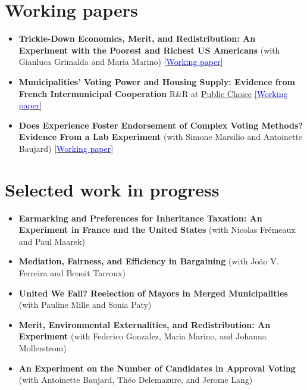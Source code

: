 \documentclass[11pt,a4paper,sans,unicode]{moderncv} %
\begin{document}
\section{Working papers}

\begin{itemize}

    \item \textbf{Trickle-Down Economics, Merit, and Redistribution: An Experiment with the Poorest and Richest US Americans} (with Gianluca Grimalda and Maria Marino) \href{https://hal.science/hal-05112815}{[\textcolor{blue}{Working paper}]} 
    \item \textbf{Municipalities' Voting Power and Housing Supply: Evidence from French Intermunicipal Cooperation} R\&R at \underline{Public Choice} \href{https://hal.science/hal-05642466}{[\textcolor{blue}{Working paper}]}
    \item \textbf{Does Experience Foster Endorsement of Complex Voting Methods? Evidence From a Lab Experiment} (with Simone Marsilio and Antoinette Baujard) \href{https://papers.ssrn.com/sol3/papers.cfm?abstract_id=7101008}{[\textcolor{blue}{Working paper}]}
\end{itemize}

\section{Selected work in progress}

\begin{itemize}

    \item \textbf{Earmarking and Preferences for Inheritance Taxation: An Experiment in France and the United States} (with Nicolas Frémeaux and Paul Maarek)
    \item \textbf{Mediation, Fairness, and Efficiency in Bargaining} (with João V. Ferreira and Benoit Tarroux)
    \item \textbf{United We Fall? Reelection of Mayors in Merged Municipalities} (with Pauline Mille and Sonia Paty)
    \item \textbf{Merit, Environmental Externalities, and Redistribution: An Experiment} (with Federico Gonzalez, Maria Marino, and Johanna Mollerstrom)
    \item \textbf{An Experiment on the Number of Candidates in Approval Voting} (with Antoinette Baujard, Théo Delemazure, and Jerome Lang)
\end{itemize}

\end{document}
